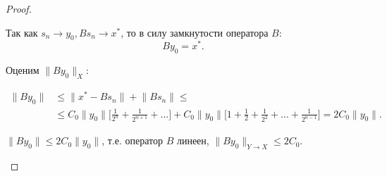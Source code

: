 \documentclass[12pt,a4paper,titlepage,oneside]{book}
\theoremstyle{definition}
\theoremstyle{plain}
\theoremstyle{break}
\theoremstyle{remark}
\theoremstyle{remark}
\theoremstyle{remark}
\theoremstyle{remark}
\theoremstyle{plain}
\theoremstyle{plain}
\begin{document}
\begin{proof}
\begin{enumerate}
Так как $s_n \to y_0, B s_n \to x^*$, то в силу замкнутости оператора $B$: 
$$B y_0=x^*.$$

Оценим $\lVert B y_0 \rVert _X$:

\begin{align*}
\lVert B y_0 \rVert &\leqslant \lVert x^* - B s_n \rVert + \lVert B s_n \rVert \leqslant \\
&\leqslant C_0 \lVert y_0\rVert \Big[ \frac{1}{2^n} + \frac{1}{2^{n+1}}+\ldots \Big] + C_0 \lVert y_0\rVert \Big[ 1+\frac{1}{2} +\frac{1}{2^2}+ \ldots+\frac{1}{2^{n-1}} \Big]= 2 C_0 \lVert y_0\rVert.
\end{align*}

$\lVert B y_0 \rVert \leqslant 2 C_0 \lVert y_0\rVert$, т.е. оператор $B$ линеен, $ \lVert B y_0 \rVert _{Y \to X} \leqslant 2 C_0$.
\qedhere
\end{enumerate}
\end{proof}
\end{document}

